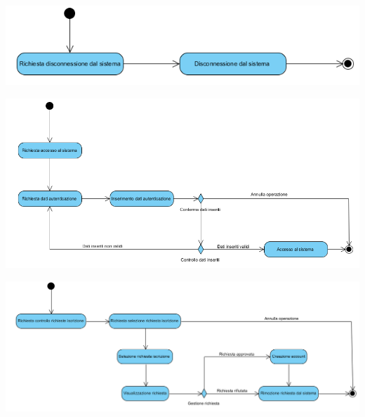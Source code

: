 \begin{center}
	\includegraphics[width=\textwidth]{assets/visualParadigm/attivita/logout}
\end{center}

\begin{center}
	\includegraphics[width=\textwidth]{assets/visualParadigm/attivita/login}
\end{center}

\begin{center}
	\includegraphics[width=\textwidth]{assets/visualParadigm/attivita/approvazioneIscrizione}
\end{center}


